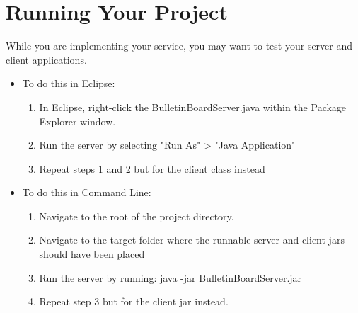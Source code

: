 \documentclass{article}
\begin{document}
\section{Running Your Project} %
While you are implementing your service, you may want to test your server and client applications. \\
\begin{itemize}
\item To do this in Eclipse:
	\begin{enumerate}
	\item In Eclipse, right-click the BulletinBoardServer.java within the Package Explorer window.
	\item Run the server by selecting "Run As" > "Java Application"
	\item Repeat steps 1 and 2 but for the client class instead
	\end{enumerate}
\item To do this in Command Line:
	\begin{enumerate}
	\item Navigate to the root of the project directory.
	\item Navigate to the target folder where the runnable server and client jars should have been placed
	\item Run the server by running: java -jar BulletinBoardServer.jar
	\item Repeat step 3 but for the client jar instead. 
	\end{enumerate}
\end{itemize}
\end{document}
